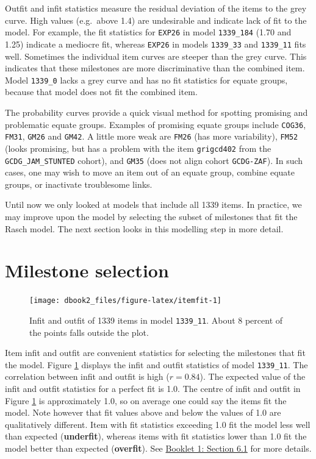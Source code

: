 \documentclass[
]{book}
\begin{document}
Outfit and infit statistics measure the residual deviation of the items to the grey curve. High values (e.g.~above 1.4) are undesirable and indicate lack of fit to the model. For example, the fit statistics for \texttt{EXP26} in model \texttt{1339\_184} (1.70 and 1.25) indicate a mediocre fit, whereas \texttt{EXP26} in models \texttt{1339\_33} and \texttt{1339\_11} fits well. Sometimes the individual item curves are steeper than the grey curve. This indicates that these milestones are more discriminative than the combined item. Model \texttt{1339\_0} lacks a grey curve and has no fit statistics for equate groups, because that model does not fit the combined item.

The probability curves provide a quick visual method for spotting promising and problematic equate groups. Examples of promising equate groups include \texttt{COG36}, \texttt{FM31}, \texttt{GM26} and \texttt{GM42}. A little more weak are \texttt{FM26} (has more variability), \texttt{FM52} (looks promising, but has a problem with the item \texttt{grigcd402} from the \texttt{GCDG\_JAM\_STUNTED} cohort), and \texttt{GM35} (does not align cohort \texttt{GCDG-ZAF}). In such cases, one may wish to move an item out of an equate group, combine equate groups, or inactivate troublesome links.

Until now we only looked at models that include all 1339 items. In practice, we may improve upon the model by selecting the subset of milestones that fit the Rasch model. The next section looks in this modelling step in more detail.

\hypertarget{sec:milestoneselection}{%
\section{Milestone selection}\label{sec:milestoneselection}}

\begin{figure}

{\centering \texttt{[image: dbook2\_files/figure-latex/itemfit-1]} 

}

\caption{Infit and outfit of 1339 items in model \texttt{1339\_11}. About 8 percent of the points falls outside the plot.}\label{fig:itemfit}
\end{figure}



Item infit and outfit are convenient statistics for selecting the milestones that fit the model. Figure \ref{fig:itemfit} displays the infit and outfit statistics of model \texttt{1339\_11}. The correlation between infit and outfit is high (\(r = 0.84\)). The expected value of the infit and outfit statistics for a perfect fit is 1.0. The centre of infit and outfit in Figure \ref{fig:itemfit} is approximately 1.0, so on average one could say the items fit the model. Note however that fit values above and below the values of 1.0 are qualitatively different. Item with fit statistics exceeding 1.0 fit the model less well than expected (\textbf{underfit}), whereas items with fit statistics lower than 1.0 fit the model better than expected (\textbf{overfit}). See \href{https://d-score.org/dbook1/sec-itemfit.html}{Booklet 1: Section 6.1} for more details.
\end{document}

